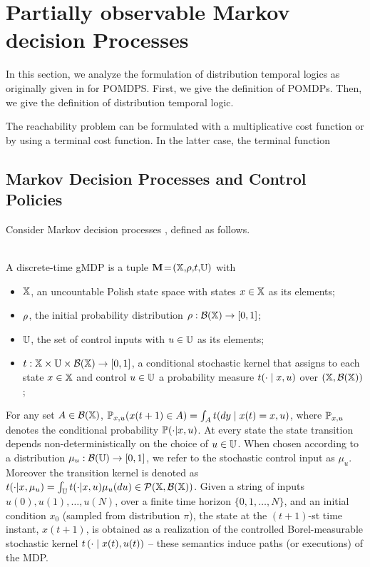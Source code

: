 \documentclass{ifacconf}
\begin{document}
    
 
\section{Partially observable Markov decision Processes}
In this section, we  analyze the formulation of distribution temporal logics as originally given in \cite{JonesDTL2013} for POMDPS. 
First, we give the definition of POMDPs. Then,  we  give the definition of distribution temporal logic. 


The reachability problem can be formulated with a multiplicative cost function or by using a terminal cost function. In the latter case, the terminal function 


\subsection{Markov Decision Processes and Control Policies}
Consider Markov decision processes \citep{Bertsekas2012,mt1993,hll1996}, defined as follows.%
\begin{definition}\label{def:MDP} \mbox{ }\\
  A discrete-time gMDP is a tuple ${\mathbf{M}}\!=\!({\mathbb{X}},\!\rho,\!t,\!{\mathbb{U}})$ with
  \begin{itemize}
    \item ${\mathbb{X}}$,  an uncountable Polish state space with states $x\in{\mathbb{X}}$ as its elements;
    \item $\rho$, the initial probability distribution $\rho:\mathcal{B}({\mathbb{X}})\rightarrow [0,1]$;
    \item ${\mathbb{U}}$, the set of control inputs with $u\in{\mathbb{U}}$ as its elements;
    \item $t:{\mathbb{X}}\times{\mathbb{U}}\times\mathcal B({\mathbb{X}})\rightarrow[0,1]$, a conditional stochastic kernel that assigns to each state $x\in {\mathbb{X}}$ and control $u\in {\mathbb{U}}$ a probability measure $t(\cdot\mid x,u)$ over $({\mathbb{X}},\mathcal B({\mathbb{X}}))$;
  \end{itemize}
\end{definition}
For any set $A\in \mathcal{B}({\mathbb{X}})$, $\po_{x,u}(x(t+1)\in A)=\int_A \tr(dy\mid x(t)=x,u)$, where $\mathbb{P}_{x,u}$ denotes the conditional probability $\mathbb{P}(\cdot{\mid} x,u)$.
At every state the state transition depends non-deterministically on the choice of $u\in {\mathbb{U}}$.
When chosen according to
a distribution  $\mu_u:\mathcal{B}({\mathbb{U}})\rightarrow [0,1]$, we refer to the stochastic control input as $\mu_u$. Moreover
the transition kernel is denoted as $\tr(\cdot| x, \mu_u)=\int_\U \tr(\cdot| x, u) \mu_u(du)\in \mathcal P(\X,\mathcal B(\X))$.
Given a string of inputs
$u(0), u(1), \ldots, u(N)$,
over a finite time horizon $\{0,1,\ldots, N\}$,
and an initial condition  $x_0$ (sampled from distribution $\pi$),
the state at the $(t+1)$-st time instant, $x(t+1)$,
is obtained as a realization of the controlled Borel-measurable stochastic kernel $t\left(\cdot\mid x(t), u(t) \right)$ --
these semantics induce paths (or executions) of the MDP.
 
\end{document}
